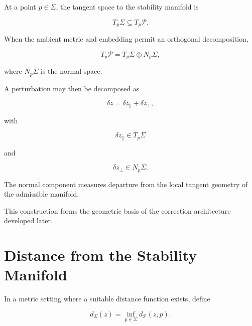 \documentclass[12pt,oneside]{book}
\begin{document}
At a point \(p\in\Sigma\), the tangent space to the stability
manifold is

\begin{equation}
    T_p\Sigma
    \subseteq
    T_p\mathcal{P}.
\end{equation}

When the ambient metric and embedding permit an orthogonal
decomposition,

\begin{equation}
    T_p\mathcal{P}
    =
    T_p\Sigma
    \oplus
    N_p\Sigma,
    \label{eq:tangent-normal-space-decomposition}
\end{equation}

where \(N_p\Sigma\) is the normal space.

A perturbation may then be decomposed as

\begin{equation}
    \delta z
    =
    \delta z_{\parallel}
    +
    \delta z_{\perp},
    \label{eq:perturbation-decomposition}
\end{equation}

with

\begin{equation}
    \delta z_{\parallel}
    \in
    T_p\Sigma
\end{equation}

and

\begin{equation}
    \delta z_{\perp}
    \in
    N_p\Sigma.
\end{equation}

The normal component measures departure from the local tangent
geometry of the admissible manifold.

This construction forms the geometric basis of the correction
architecture developed later.


\section{Distance from the Stability Manifold}
\label{sec:distance-stability-manifold}

In a metric setting where a suitable distance function exists,
define

\begin{equation}
    d_{\Sigma}(z)
    =
    \inf_{p\in\Sigma}
    d_{\mathcal{P}}(z,p).
    \label{eq:chapter-three-distance-manifold}
\end{equation}
\end{document}
